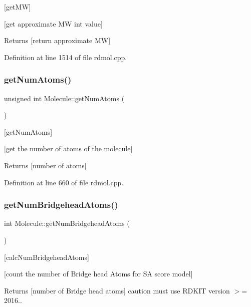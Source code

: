 \mbox{[}get\+MW\mbox{]} 

\mbox{[}get approximate MW int value\mbox{]}

\begin{DoxyReturn}{Returns}
\mbox{[}return approximate MW\mbox{]} 
\end{DoxyReturn}


Definition at line 1514 of file rdmol.\+cpp.

\mbox{\label{class_molecule_a23bfc1c88f4aff43e87af062fe295922}} 
\subsubsection{\texorpdfstring{get\+Num\+Atoms()}{getNumAtoms()}}
{\footnotesize\ttfamily unsigned int Molecule\+::get\+Num\+Atoms (\begin{DoxyParamCaption}{ }\end{DoxyParamCaption})}



\mbox{[}get\+Num\+Atoms\mbox{]} 

\mbox{[}get the number of atoms of the molecule\mbox{]} \begin{DoxyReturn}{Returns}
\mbox{[}number of atoms\mbox{]} 
\end{DoxyReturn}


Definition at line 660 of file rdmol.\+cpp.

\mbox{\label{class_molecule_a9d22135d69888e8d269ac5384a424f83}} 
\subsubsection{\texorpdfstring{get\+Num\+Bridgehead\+Atoms()}{getNumBridgeheadAtoms()}}
{\footnotesize\ttfamily int Molecule\+::get\+Num\+Bridgehead\+Atoms (\begin{DoxyParamCaption}{ }\end{DoxyParamCaption})}



\mbox{[}calc\+Num\+Bridgehead\+Atoms\mbox{]} 

\mbox{[}count the number of Bridge head Atoms for SA score model\mbox{]} \begin{DoxyReturn}{Returns}
\mbox{[}number of Bridge head atoms\mbox{]} caution must use R\+D\+K\+IT version $>$= 2016.. 
\end{DoxyReturn}


